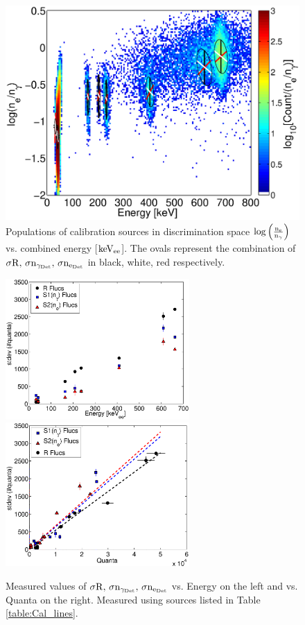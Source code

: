  \begin{figure}[h!]\centering
\includegraphics[width=120mm]{Chapter_Flucs/Figures/All_disc.eps}
\caption{Populations of calibration sources in discrimination space $\rm log\left(\frac{n_e}{n_\gamma}\right) $ vs. combined energy [$\rm keV_{ee}$]. The ovals represent the combination of $\rm \sigma R, \, \sigma n_{\gamma_{Det}}, \,\sigma n_{e_{Det}} $ in black, white, red respectively.}
\label{fig:E_dis}
\end{figure}

 \begin{figure}[h!]\centering
\includegraphics[width=70mm]{Chapter_Flucs/Figures/fluc_E.eps}
\includegraphics[width=70mm]{Chapter_Flucs/Figures/fluc_Q.eps}
\caption{Measured values of $\rm \sigma R, \, \sigma n_{\gamma_{Det}}, \,\sigma n_{e_{Det}} $ vs. Energy on the left and vs. Quanta on the right. Measured using sources listed in Table \ref{table:Cal_lines}. }
\label{fig:Flucs}
\end{figure}


